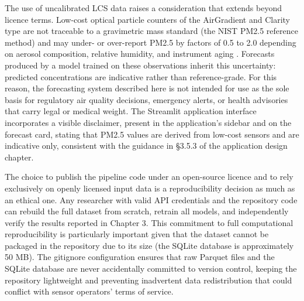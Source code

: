 The use of uncalibrated LCS data raises a consideration that extends beyond licence terms. Low-cost optical particle counters of the AirGradient and Clarity type are not traceable to a gravimetric mass standard (the NIST PM2.5 reference method) and may under- or over-report PM2.5 by factors of 0.5 to 2.0 depending on aerosol composition, relative humidity, and instrument aging \cite{who_aqg_2021}. Forecasts produced by a model trained on these observations inherit this uncertainty: predicted concentrations are indicative rather than reference-grade. For this reason, the forecasting system described here is not intended for use as the sole basis for regulatory air quality decisions, emergency alerts, or health advisories that carry legal or medical weight. The Streamlit application interface incorporates a visible disclaimer, present in the application's sidebar and on the forecast card, stating that PM2.5 values are derived from low-cost sensors and are indicative only, consistent with the guidance in §3.5.3 of the application design chapter.

The choice to publish the pipeline code under an open-source licence and to rely exclusively on openly licensed input data is a reproducibility decision as much as an ethical one. Any researcher with valid API credentials and the repository code can rebuild the full dataset from scratch, retrain all models, and independently verify the results reported in Chapter 3. This commitment to full computational reproducibility is particularly important given that the dataset cannot be packaged in the repository due to its size (the SQLite database is approximately 50 MB). The gitignore configuration ensures that raw Parquet files and the SQLite database are never accidentally committed to version control, keeping the repository lightweight and preventing inadvertent data redistribution that could conflict with sensor operators' terms of service.
